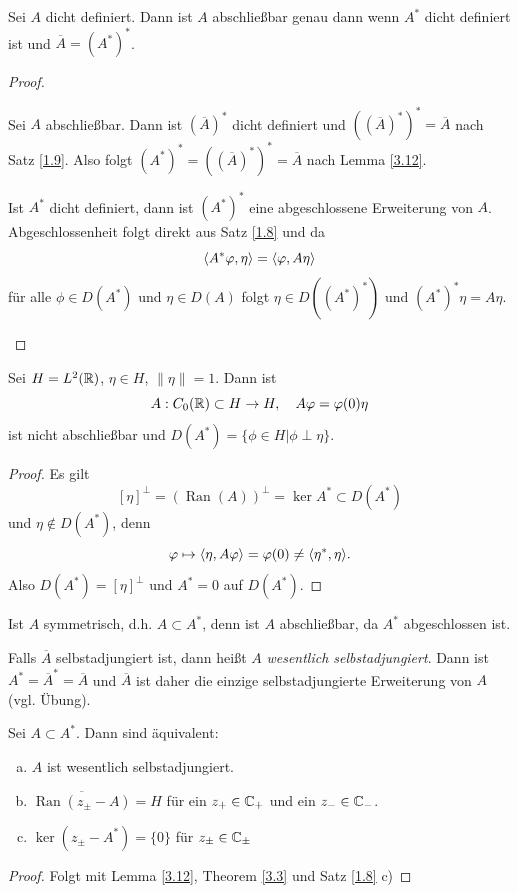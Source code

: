 \documentclass{mycourse}
\newcommand{\Ran}{\operatorname{Ran}}
\begin{document}
\begin{st}
Sei $A$ dicht definiert. Dann ist $A$ abschließbar genau dann wenn $A^*$ dicht definiert ist und $\overline{A}=(A^*)^*$.
\end{st}
\begin{proof}
\begin{seg}[$\implies$]
Sei $A$ abschließbar. Dann ist $(\overline{A})^*$ dicht definiert und $((\overline{A})^*)^*=\overline{A}$ nach Satz \ref{1.9}. Also folgt $(A^*)^*=((\overline{A})^*)^*=\overline{A}$ nach Lemma \ref{3.12}.
\end{seg}
\begin{seg}[$\Longleftarrow$]
Ist $A^*$ dicht definiert, dann ist $(A^*)^*$ eine abgeschlossene Erweiterung von $A$. Abgeschlossenheit folgt direkt aus Satz \ref{1.8} und da
\[
\langle A^* \varphi, \eta\rangle = \langle \varphi, A\eta\rangle
\]
für alle $\phi\in D(A^*)$ und $\eta\in D(A)$ folgt $\eta \in D((A^*)^*)$ und $(A^*)^*\eta = A\eta$. 
\end{seg}
\end{proof}
\begin{ex*}
Sei $H= L^2(\mathbb{R})$, $\eta\in H$, $\| \eta \|=1$. Dann ist
\[
A: C_0(\mathbb{R}) \subset H \to H,\quad A\varphi = \varphi(0)\eta
\]
ist nicht abschließbar und $D(A^*)=\{\phi \in H|\phi \perp \eta\}$.
\end{ex*}
\begin{proof}
Es gilt
\[
[\eta]^\perp = (\Ran(A))^\perp= \ker A^* \subset D(A^*)
\]
und $\eta\not\in D(A^*)$, denn
\[
\varphi \mapsto \langle \eta, A\varphi\rangle = \varphi(0) \neq \langle \eta^*, \eta\rangle.
\]
Also $D(A^*)=[\eta]^\perp$ und $A^*=0$ auf $D(A^*)$.
\end{proof}
Ist $A$ symmetrisch, d.h. $A\subset A^*$, denn ist $A$ abschließbar, da $A^*$ abgeschlossen ist.

Falls $\overline{A}$ selbstadjungiert ist, dann heißt $A$ \emph{wesentlich selbstadjungiert}. Dann ist
$A^*=\overline{A}^*=\overline{A}$ und $\overline{A}$ ist daher die einzige selbstadjungierte Erweiterung von $A$ (vgl. Übung).

\begin{st}
Sei $A\subset A^*$. Dann sind äquivalent:
\begin{enumerate}[a)]
\item $A$ ist wesentlich selbstadjungiert.
\item $\overline{\Ran(z_\pm -A)}=H$ für ein $z_+\in \mathbb{C}_+$ und ein $z_-\in \mathbb{C}_-$.
\item $\ker(z_\pm - A^*)= \{0\}$ für $z_\pm \in \mathbb{C}_\pm$
\end{enumerate}
\end{st}
\begin{proof}
Folgt mit Lemma \ref{3.12}, Theorem \ref{3.3} und Satz \ref{1.8} c)
\end{proof}
\end{document}
